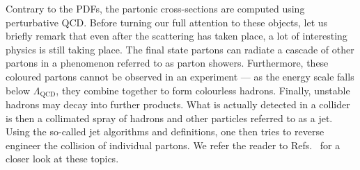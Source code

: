 \documentclass[main.tex]{subfiles}
\begin{document}
Contrary to the PDFs, the partonic cross-sections are computed using perturbative QCD. Before turning our full attention to these objects, let us briefly remark that even after the scattering has taken place, a lot of interesting physics is still taking place. The final state partons can radiate a cascade of other partons in a phenomenon referred to as parton showers. Furthermore, these coloured partons cannot be observed in an experiment --- as the energy scale falls below $\Lambda_\text{QCD}$, they combine together to form colourless hadrons. Finally, unstable hadrons may decay into further products. What is actually detected in a collider is then a collimated spray of hadrons and other particles referred to as a jet. Using the so-called jet algorithms and definitions, one then tries to reverse engineer the collision of individual partons. We refer the reader to Refs.~\cite{Plehn:2009nd, Hoche:2014rga} for a closer look at these topics.
\end{document}
